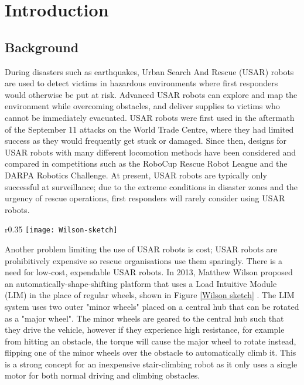 \chapter{Introduction}

\section{Background}

During disasters such as earthquakes, Urban Search And Rescue (USAR) robots are used to detect victims in hazardous environments where first responders would otherwise be put at risk. Advanced USAR robots can explore and map the environment while overcoming obstacles, and deliver supplies to victims who cannot be immediately evacuated. USAR robots were first used in the aftermath of the September 11 attacks on the World Trade Centre, where they had limited success as they would frequently get stuck or damaged. Since then, designs for USAR robots with many different locomotion methods have been considered and compared in competitions such as the RoboCup Rescue Robot League and the DARPA Robotics Challenge. At present, USAR robots are typically only successful at surveillance; due to the extreme conditions in disaster zones and the urgency of rescue operations, first responders will rarely consider using USAR robots.\\

\begin{wrapfigure}{r}{0.35\textwidth} %
	\centering
	\texttt{[image: Wilson-sketch]}
	\caption{Systems layout of Wilson's LIM device \citep{Wilson-2013}}
	\label{Wilson sketch}
\end{wrapfigure}

\noindent Another problem limiting the use of USAR robots is cost; USAR robots are prohibitively expensive so rescue organisations use them sparingly. There is a need for low-cost, expendable USAR robots. In 2013, Matthew Wilson proposed an automatically-shape-shifting platform that uses a Load Intuitive Module (LIM) in the place of regular wheels, shown in Figure \ref{Wilson sketch} \citep{Wilson-2013}. The LIM system uses two outer "minor wheels" placed on a central hub that can be rotated as a "major wheel". The minor wheels are geared to the central hub such that they drive the vehicle, however if they experience high resistance, for example from hitting an obstacle, the torque will cause the major wheel to rotate instead, flipping one of the minor wheels over the obstacle to automatically climb it. This is a strong concept for an inexpensive stair-climbing robot as it only uses a single motor for both normal driving and climbing obstacles.\\



